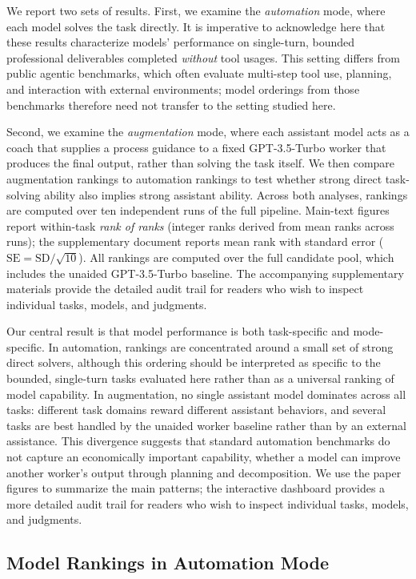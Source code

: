 
We report two sets of results. First, we examine the \emph{automation} mode, where each model solves the task directly. It is imperative to acknowledge here that these results characterize models' performance on single-turn, bounded professional deliverables completed \emph{without} tool usages. This setting differs from public agentic benchmarks, which often evaluate multi-step tool use, planning, and interaction with external environments; model orderings from those benchmarks therefore need not transfer to the setting studied here.

Second, we examine the \emph{augmentation} mode, where each assistant model acts as a coach that supplies a process guidance to a fixed GPT-3.5-Turbo worker that produces the final output, rather than solving the task itself. We then compare augmentation rankings to automation rankings to test whether strong direct task-solving ability also implies strong assistant ability. Across both analyses, rankings are computed over ten independent runs of the full pipeline. Main-text figures report within-task \emph{rank of ranks} (integer ranks derived from mean ranks across runs); the supplementary document reports mean rank with standard error ($\mathrm{SE}=\mathrm{SD}/\sqrt{10}$). All rankings are computed over the full candidate pool, which includes the unaided GPT-3.5-Turbo baseline. The accompanying supplementary materials provide the detailed audit trail for readers who wish to inspect individual tasks, models, and judgments.

Our central result is that model performance is both task-specific and mode-specific. In automation, rankings are concentrated around a small set of strong direct solvers, although this ordering should be interpreted as specific to
the bounded, single-turn tasks evaluated here rather than as a universal ranking of model capability. In augmentation, no single assistant model dominates across all tasks: different task domains reward different assistant behaviors, and several tasks are best handled by the unaided worker baseline rather than by an external assistance. This divergence suggests that standard automation benchmarks do not capture an economically important capability, whether a model can improve another worker's output through planning and decomposition. We use the paper figures to summarize the main patterns; the interactive dashboard provides a more detailed audit trail for readers who wish to inspect individual tasks, models, and judgments.

\subsection{Model Rankings in Automation Mode}

